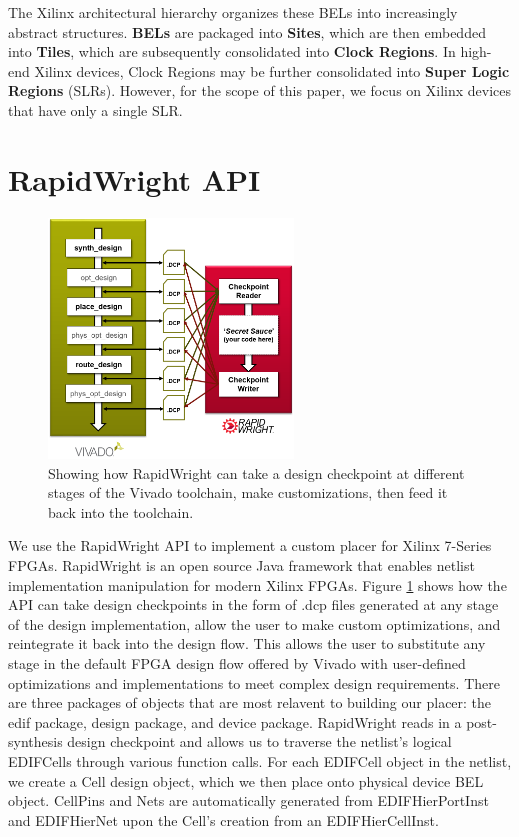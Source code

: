 \documentclass[twocolumn]{article}
\begin{document}
    The Xilinx architectural hierarchy organizes these BELs into increasingly abstract structures. 
    \textbf{BELs} are packaged into \textbf{Sites}, which are then embedded into \textbf{Tiles}, which are subsequently consolidated into \textbf{Clock Regions}. 
    In high-end Xilinx devices, Clock Regions may be further consolidated into \textbf{Super Logic Regions} (SLRs). 
    However, for the scope of this paper, we focus on Xilinx devices that have only a single SLR. 


\section{RapidWright API}
    \begin{figure}
        \centering
        \includegraphics[width=6.5cm]{figures/vivado_dcps.png}
        \caption{Showing how RapidWright can take a design checkpoint at different stages of the Vivado toolchain, make customizations, then feed it back into the toolchain.}
        \label{fig:vivado_dcps}
    \end{figure}

    We use the RapidWright API to implement a custom placer for Xilinx 7-Series FPGAs.
    RapidWright is an open source Java framework that enables netlist implementation manipulation for modern Xilinx FPGAs. 
    Figure \ref{fig:vivado_dcps} shows how the API can take design checkpoints in the form of .dcp files generated at any stage of the design implementation, allow the user to make custom optimizations, and reintegrate it back into the design flow. 
    This allows the user to substitute any stage in the default FPGA design flow offered by Vivado with user-defined optimizations and implementations to meet complex design requirements. 
    There are three packages of objects that are most relavent to building our placer: the edif package, design package, and device package. 
    RapidWright reads in a post-synthesis design checkpoint and allows us to traverse the netlist's logical EDIFCells through various function calls. 
    For each EDIFCell object in the netlist, we create a Cell design object, which we then place onto physical device BEL object. 
    CellPins and Nets are automatically generated from EDIFHierPortInst and EDIFHierNet upon the Cell's creation from an EDIFHierCellInst. 
\end{document}
